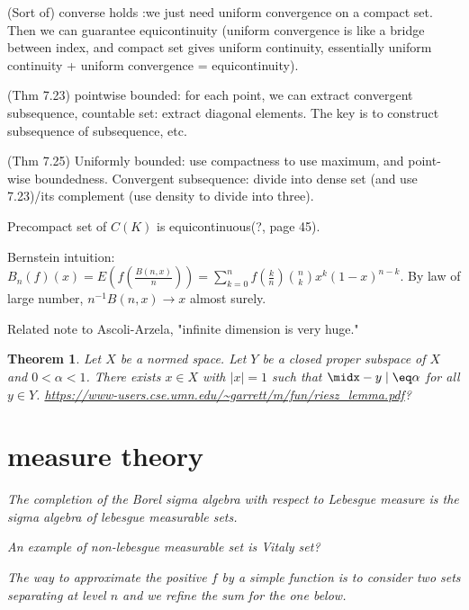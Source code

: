 \documentclass{article}
\newtheorem{theorem}{Theorem}
\theoremstyle{remark}
\begin{document}
\begin{itemize}
\item (Sort of) converse holds :we just need uniform convergence on a compact set. Then we can guarantee equicontinuity (uniform convergence is like a bridge between index, and compact set gives uniform continuity, essentially uniform continuity + uniform convergence = equicontinuity).
\item (Thm 7.23) pointwise bounded: for each point, we can extract convergent subsequence, countable set: extract diagonal elements. The key is to construct subsequence of subsequence, etc.
\item (Thm 7.25) Uniformly bounded: use compactness to use maximum, and point-wise boundedness. Convergent subsequence: divide into dense set (and use 7.23)/its complement (use density to divide into three).
\item Precompact set of $C(K)$ is equicontinuous(?, page 45).
\item Bernstein intuition: $B_n(f)(x)=E(f(\frac{B(n,x)}n))=\sum_{k=0}^n f(\frac kn)\binom nkx^k(1-x)^{n-k}$. By law of large number, $n^{-1}B(n,x)\to x$ almost surely.
\item Related note to Ascoli-Arzela, "infinite dimension is very huge."

\begin{theorem}
Let $X$ be a normed space. Let $Y$ be a closed proper subspace of $X$ and $0<\alpha<1$. There exists $x\in X$ with $\mid x\mid=1$ such that $\midx-y\mid\eq \alpha$ for all $y\in Y$. \url{https://www-users.cse.umn.edu/~garrett/m/fun/riesz_lemma.pdf}?





\section*{measure theory}
\item The completion of the Borel sigma algebra with respect to Lebesgue measure is the sigma algebra of lebesgue measurable sets.
\item An example of non-lebesgue measurable set is Vitaly set?
\item The way to approximate the positive $f$ by a simple function is to consider two sets separating at level $n$ and we refine the sum for the one below. 

\end{theorem}
\end{itemize}
\end{document}
